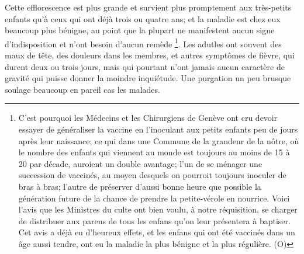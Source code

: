 Cette efflorescence est plus grande et survient plus promptement aux très-petits enfants qu’à ceux qui ont déjà trois ou quatre ans; et la maladie est chez eux beaucoup plus bénigne, au point que la plupart ne manifestent aucun signe d’indisposition et n’ont besoin d’aucun remède \footnote{C’est pourquoi les Médecins et les Chirurgiens de Genève ont cru devoir essayer de généraliser la vaccine en l’inoculant aux petits enfants peu de jours après leur naissance; ce qui dans une Commune de la grandeur de la nôtre, où le nombre des enfants qui viennent au monde est toujours au moins de 15 à 20 par décade, auroient un double avantage; l'un de se ménager une succession de vaccinés, au moyen desquels on pourroit toujours inoculer de bras à bras; l'autre de préserver d'aussi bonne heure que possible la génération future de la chance de prendre la petite-vérole en nourrice. Voici l'avis que les Ministres du culte ont bien voulu, à notre réquisition, se charger de distribuer aux parens de tous les enfans qu'on leur présentera à baptiser. Cet avis a déjà eu d'heureux effets, et les enfans qui ont été vaccinés dans un âge aussi tendre, ont eu la maladie la plus bénigne et la plus régulière. (O)}. Les adutles ont\setcounter{page}{359} souvent des maux de tête, des douleurs dans les membres, et autres symptômes de fièvre, qui durent deux ou trois jours, mais qui pourtant n'ont jamais aucun caractère de gravité qui puisse donner la moindre inquiétude. Une purgation un peu brusque soulage beaucoup en pareil cas les malades.
